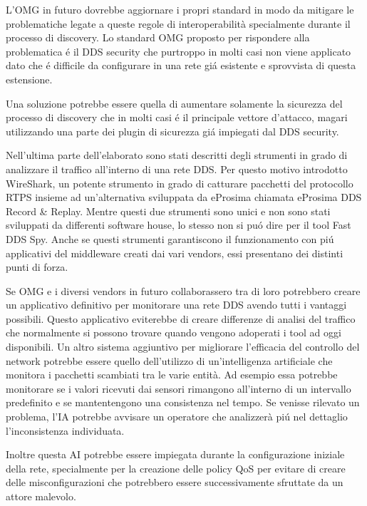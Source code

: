 L'OMG in futuro dovrebbe aggiornare i propri standard in modo da 
mitigare le problematiche legate a queste regole di interoperabilità
specialmente durante il 
processo di discovery. Lo standard OMG proposto per rispondere alla problematica
é il DDS security che purtroppo in molti casi 
non viene applicato dato che é difficile da 
configurare in una rete giá esistente e sprovvista di questa estensione.

Una soluzione potrebbe essere quella di aumentare solamente 
la sicurezza del 
processo di discovery che in molti casi é il 
principale vettore d'attacco, magari 
utilizzando una parte dei plugin di sicurezza giá impiegati dal DDS security.

Nell'ultima parte dell'elaborato sono stati descritti degli strumenti 
in grado di analizzare il traffico all'interno di una rete DDS.
Per questo motivo introdotto WireShark, un potente strumento in grado di 
catturare pacchetti del protocollo RTPS insieme ad un'alternativa
sviluppata da eProsima chiamata eProsima DDS Record \&
Replay. Mentre questi due strumenti sono unici e non sono stati 
sviluppati da differenti software house, lo stesso non 
si puó dire per il tool Fast DDS Spy.
Anche se questi strumenti garantiscono il funzionamento 
con piú applicativi del middleware creati dai vari vendors, essi
presentano dei distinti punti di forza. 

Se OMG e i diversi vendors in futuro collaborassero tra di loro 
potrebbero creare un applicativo definitivo per monitorare 
una rete DDS avendo tutti i vantaggi possibili. Questo applicativo 
eviterebbe di creare differenze di analisi del
traffico che normalmente 
si possono trovare quando vengono adoperati i tool ad oggi 
disponibili.
Un altro sistema aggiuntivo per migliorare l'efficacia del 
controllo del network potrebbe essere quello 
dell'utilizzo di un'intelligenza artificiale che monitora 
i pacchetti scambiati tra le varie entità. 
Ad esempio essa potrebbe monitorare se i valori ricevuti dai sensori 
rimangono all'interno di un intervallo predefinito e se 
mantentengono una consistenza nel tempo. Se venisse rilevato 
un problema, l'IA potrebbe avvisare un operatore che 
analizzerà piú nel dettaglio l'inconsistenza individuata.

Inoltre questa AI potrebbe 
essere impiegata durante la configurazione iniziale della rete,
specialmente per la creazione delle policy QoS per evitare
di creare delle misconfigurazioni che potrebbero essere
successivamente sfruttate da un attore malevolo.

